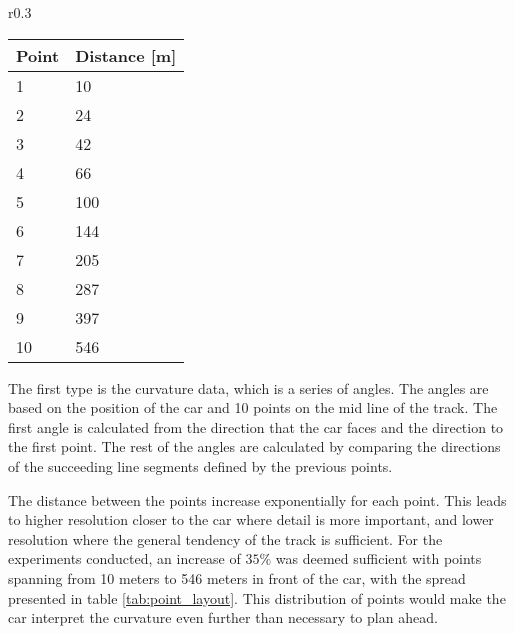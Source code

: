 \begin{wraptable}{r}{0.3\textwidth}
    \vspace{-15pt}
    \hspace{5pt}
    \begin{tabular}{ll}
    \toprule
    Point & Distance [m]\\
    \midrule
    1 & 10\\
    2 & 24\\
    3 & 42\\
    4 & 66\\
    5 & 100\\
    6 & 144\\
    7 & 205\\
    8 & 287\\
    9 & 397\\
    10 & 546\\
    \bottomrule
    \end{tabular}
    \caption{Distance from the car to each point as given input.}
    \label{tab:point_layout}
\end{wraptable}

The first type is the curvature data, which is a series of angles. The angles are based on the position of the car and 10 points on the mid line of the track. The first angle is calculated from the direction that the car faces and the direction to the first point. The rest of the angles are calculated by comparing the directions of the succeeding line segments defined by the previous points.

The distance between the points increase exponentially for each point. This leads to higher resolution closer to the car where detail is more important, and lower resolution where the general tendency of the track is sufficient. For the experiments conducted, an increase of $35\%$ was deemed sufficient with points spanning from 10 meters to 546 meters in front of the car, with the spread presented in table \ref{tab:point_layout}. This distribution of points would make the car interpret the curvature even further than necessary to plan ahead.



